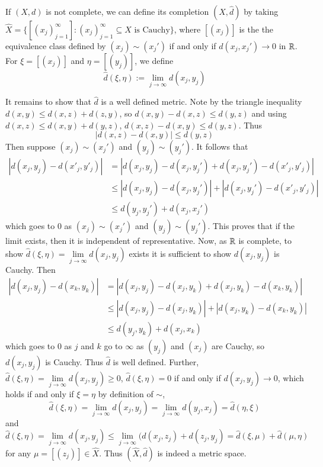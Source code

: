 \begin{definition}
    If $(X,d)$ is not complete, we can define its completion $(\hat{X},\hat{d})$ by taking $\hat{X} = \{[(x_j)_{j=1}^{\infty}] : (x_j)_{j=1}^{\infty}\subseteq X\text{ is Cauchy}\}$, where $[(x_j)]$ is the the equivalence class defined by $(x_j) \sim (x_j')$ if and only if $d(x_j,x_j') \rightarrow 0$ in $\mathbb R$. For $\xi = [(x_j)]$ and $\eta = [(y_j)]$, we define \begin{equation*}
        \hat{d}(\xi,\eta) := \lim\limits_{j\rightarrow \infty}d(x_j,y_j)
    \end{equation*}
\end{definition}
It remains to show that $\hat{d}$ is a well defined metric. Note by the triangle inequality $d(x,y) \leq d(x,z) + d(z,y)$, so $d(x,y) - d(x,z) \leq d(y,z)$ and using $d(x,z) \leq d(x,y) + d(y,z)$, $d(x,z) - d(x,y) \leq d(y,z)$. Thus $$|d(x,z) - d(x,y)| \leq d(y,z)$$ Then suppose $(x_j) \sim (x_j')$ and $(y_j) \sim (y_j')$. It follows that \begin{align*}
    |d(x_j,y_j) - d(x'_j,y'_j)| &= |d(x_j,y_j) - d(x_j,y_j') + d(x_j,y_j') - d(x'_j,y'_j)| \\
    &\leq |d(x_j,y_j) - d(x_j,y_j')| + |d(x_j,y_j') - d(x'_j,y'_j)| \\
    &\leq d(y_j,y_j') + d(x_j,x_j')
\end{align*}
which goes to $0$ as $(x_j)\sim(x_j')$ and $(y_j)\sim(y_j')$. This proves that if the limit exists, then it is independent of representative. Now, as $\mathbb R$ is complete, to show $\hat{d}(\xi,\eta) = \lim\limits_{j\rightarrow \infty}d(x_j,y_j)$ exists it is sufficient to show $d(x_j,y_j)$ is Cauchy. Then \begin{align*}
    |d(x_j,y_j) - d(x_k,y_k)| &= |d(x_j,y_j) - d(x_j,y_k) + d(x_j,y_k) - d(x_k,y_k)| \\
    &\leq |d(x_j,y_j) - d(x_j,y_k)| + |d(x_j,y_k) - d(x_k,y_k)| \\
    &\leq d(y_j,y_k) + d(x_j,x_k)
\end{align*}
which goes to $0$ as $j$ and $k$ go to $\infty$ as $(y_j)$ and $(x_j)$ are Cauchy, so $d(x_j,y_j)$ is Cauchy. Thus $\hat{d}$ is well defined. Further, $\hat{d}(\xi,\eta) = \lim\limits_{j\rightarrow \infty}d(x_j,y_j) \geq 0$, $\hat{d}(\xi,\eta) = 0$ if and only if $d(x_j,y_j)\rightarrow 0$, which holds if and only if $\xi = \eta$ by definition of $\sim$, $$\hat{d}(\xi,\eta) = \lim\limits_{j\rightarrow \infty}d(x_j,y_j) = \lim\limits_{j\rightarrow \infty}d(y_j,x_j) = \hat{d}(\eta,\xi)$$
and \begin{equation*}
    \hat{d}(\xi,\eta) = \lim\limits_{j\rightarrow \infty}d(x_j,y_j) \leq \lim\limits_{j\rightarrow \infty}(d(x_j,z_j) + d(z_j,y_j) = \hat{d}(\xi,\mu) + \hat{d}(\mu,\eta)
\end{equation*}
for any $\mu = [(z_j)] \in \hat{X}$. Thus $(\hat{X},\hat{d})$ is indeed a metric space.


